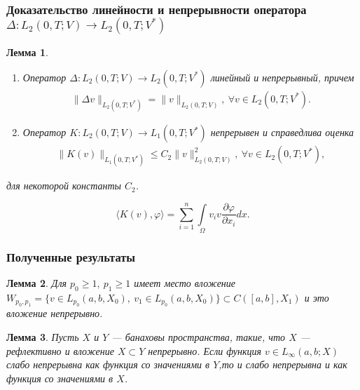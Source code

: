 \documentclass[10pt, pdf, hyperref={unicode}]{beamer}
\newtheorem{ru_lemma}{Лемма}
\renewenvironment{lemma}{\begin{ru_lemma}}{\end{ru_lemma}}
\begin{document}
  \begin{frame}
    \frametitle{Доказательство линейности и непрерывности оператора $\Delta:L_2 (0,T;V)\rightarrow L_2 (0,T;V^*)$}
    \begin{center}
      \begin{minipage}[h]{0.97\linewidth}
      \begin{lemma} ~\\
    \begin{enumerate}
        \item Оператор $\Delta: L_2(0, T; V) \rightarrow L_2(0, T; V^\ast)$ линейный и\linebreak
        непрерывный, причем
        \begin{equation}\label{eq:5.9}
            \begin{gathered}
                \| \Delta v \|_{L_2(0, T; V^\ast)} = \| v \|_{L_2(0, T; V)}, \ \forall v \in L_2(0, T; V^\ast).
            \end{gathered}
        \end{equation}
        \item Оператор $K: L_2(0, T; V) \rightarrow L_1(0, T; V^\ast)$ непрерывен и справедлива оценка
        \begin{equation}\label{eq:5.10}
            \begin{gathered}
                \| K(v) \|_{L_1(0, T; V^\ast)} \leqslant C_2\| v \|^2_{L_2(0, T;V)}, \ \forall v \in L_2(0, T; V^\ast),
            \end{gathered}
        \end{equation}
    \end{enumerate}
    для некоторой константы $C_2$.
\end{lemma}
$$\langle K(v),\varphi \rangle = \sum_{i=1}^{n}\int\limits_\Omega v_i v \frac{\partial \varphi}{\partial x_i}dx.$$
      \end{minipage}
    \end{center}
  \end{frame}


\begin{frame}
    \frametitle{Полученные результаты}
    \begin{center}
      \begin{minipage}[h]{0.97\linewidth}
        \begin{lemma}
          Для $p_0\ge 1, \ p_1\ge 1$ имеет место вложение\linebreak
          $W_{p_0,p_1}=\{v\in L_{p_0}(a,b,X_0), \ v_1\in L_{p_0}(a,b,X_0)\}\subset C([a,b],X_1)$
          и это вложение непрерывно.
        \end{lemma}
        \begin{lemma}
          Пусть $X$ и $Y$ --- банаховы пространства, такие, что $X$ --- рефлективно и вложение $X\subset Y$ непрерывно.
          Если функция $v\in L_{\infty}(a,b;X)$ слабо непрерывна как функция со значениями в $Y$,то и слабо непрерывна и как функция со значениями в $X$.
        \end{lemma}
      \end{minipage}
    \end{center}
  \end{frame}
\end{document}
